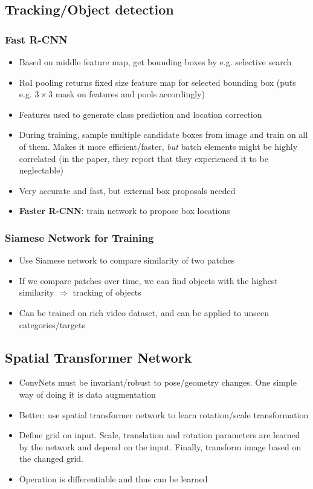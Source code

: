 \subsection{Tracking/Object detection}
\subsubsection{Fast R-CNN}
\begin{itemize}
	\item Based on middle feature map, get bounding boxes by e.g. selective search 
	\item RoI pooling returns fixed size feature map for selected bounding box (puts e.g. $3\times 3$ mask on features and pools accordingly)
	\item Features used to generate class prediction and location correction
	\item During training, sample multiple candidate boxes from image and train on all of them. Makes it more efficient/faster, \textit{but} batch elements might be highly correlated (in the paper, they report that they experienced it to be neglectable)
	\item Very accurate and fast, but external box proposals needed
	\item \textbf{Faster R-CNN}: train network to propose box locations
\end{itemize}
\subsubsection{Siamese Network for Training}
\begin{itemize}
	\item Use Siamese network to compare similarity of two patches
	\item If we compare patches over time, we can find objects with the highest similarity $\Rightarrow$ tracking of objects
	\item Can be trained on rich video dataset, and can be applied to unseen categories/targets
\end{itemize}
\subsection{Spatial Transformer Network}
\begin{itemize}
	\item ConvNets must be invariant/robust to pose/geometry changes. One simple way of doing it is data augmentation
	\item Better: use spatial transformer network to learn rotation/scale transformation
	\item Define grid on input. Scale, translation and rotation parameters are learned by the network and depend on the input. Finally, transform image based on the changed grid. 
	\item Operation is differentiable and thus can be learned
\end{itemize}